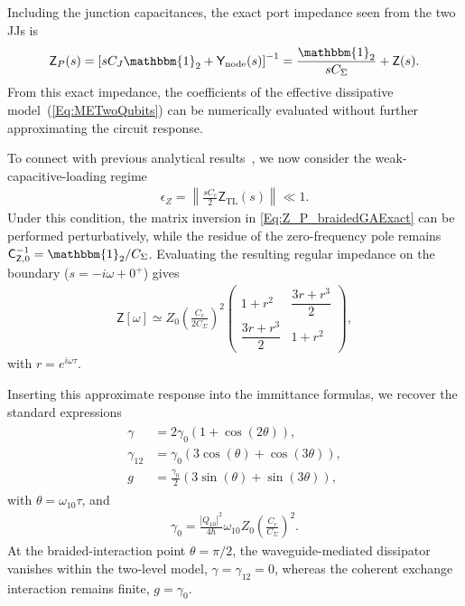 \documentclass[prx,aps,twocolumn,article]{revtex4-2}
\newcommand{\msf}[1]{\mathsf{#1}}
\newcommand{\msY}{\msf{Y}}
\newcommand{\msZ}{\msf{Z}}
\newcommand{\msZTL}{\msZ_{\mathrm{TL}}}
\newcommand{\msC}{\msf{C}}
\newcommand{\msYnode}{\msY_{\rm node}}
\newcommand{\msId}{\mathbbm{1}}
\begin{document}
Including the junction capacitances, the exact port impedance seen from
the two \gls{JJ}s is
\begin{align}
    \msZ_P(s)
    =
    \left[
        sC_J\msId_2+\msYnode(s)
    \right]^{-1}
    =
    \frac{\msId_2}{sC_\Sigma}
    +
    \msZ(s).
    \label{Eq:Z_P_braidedGAExact}
\end{align}
From this exact impedance, the coefficients of the effective
dissipative model~(\ref{Eq:METwoQubits}) can be numerically evaluated without further approximating the circuit response.

To connect with previous analytical results~\cite{Kockum:2018,Soro:2022}, we now consider the weak-capacitive-loading regime
\begin{align}
    \epsilon_Z
    =
    \left\|
        \frac{sC_c}{2}\msZTL(s)
    \right\|
    \ll 1.
    \label{Eq:ValidityPerturbativeImpedance}
\end{align}
Under this condition, the matrix inversion in \cref{Eq:Z_P_braidedGAExact} can be performed perturbatively, while the residue of the zero-frequency pole remains $\msC_{\msZ,0}^{-1}=\msId_2/C_\Sigma$. Evaluating the resulting regular
impedance on the boundary ($s=-i\omega+0^+$) gives
\begin{align}
    \msZ[\omega]
    \simeq
    Z_0
    \left(
        \frac{C_c}{2C_\Sigma}
    \right)^2
    \begin{pmatrix}
        1+r^2 & \dfrac{3r+r^3}{2} \\
        \dfrac{3r+r^3}{2} & 1+r^2
    \end{pmatrix},
    \label{Eq:ApproxGABidirectional}
\end{align}
with $r=e^{i\omega\tau}$.

Inserting this approximate response into the immittance formulas, we
recover the standard expressions~\cite{Kockum:2014,Kockum:2018,Soro:2022}
\begin{align}
\begin{aligned}
    \gamma &= 2\gamma_0 \left(1+\cos(2\theta)\right),
    \\
    \gamma_{12} &= \gamma_0 \left(3\cos(\theta)+\cos(3\theta)\right),
    \\
    g &= \frac{\gamma_0}{2}
    \left(3\sin(\theta)+\sin(3\theta)\right),
\end{aligned}
\label{Eq:GAStandardResults}
\end{align}
with $\theta=\omega_{10}\tau$, and
\begin{align}
    \gamma_0
    =
    \frac{|Q_{10}|^2}{4\hbar}
    \omega_{10}Z_0
    \left(
        \frac{C_c}{C_\Sigma}
    \right)^2.
\end{align}
At the braided-interaction point $\theta=\pi/2$, the waveguide-mediated
dissipator vanishes within the two-level model,
$\gamma=\gamma_{12}=0$, whereas the coherent exchange interaction remains
finite, $g=\gamma_0$.
\end{document}
